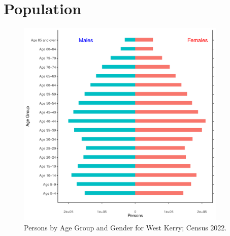 \documentclass{article}
\begin{document}
\pagebreak

\section{Population} 
\label{sect:Pop}

\begin{figure}[h]
	\centering
	\includegraphics[width = 100mm]{../figures/PyramidPlot.pdf}
	\caption{Persons by Age Group and Gender for West Kerry; Census 2022.}
	\label{fig:2ae19629-1a6a-13a3-e055-000000000001}
	\end{figure}
\end{document}
